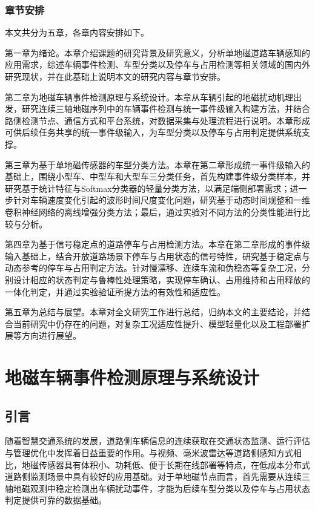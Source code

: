 \documentclass{xdupgthesis}
\begin{document}
\subsection{章节安排}
\label{sec:thesis_organization}

本文共分为五章，各章内容安排如下。

第一章为绪论。本章介绍课题的研究背景及研究意义，分析单地磁道路车辆感知的应用需求，综述车辆事件检测、车型分类以及停车与占用检测等相关领域的国内外研究现状，并在此基础上说明本文的研究内容与章节安排。

第二章为地磁车辆事件检测原理与系统设计。本章从车辆引起的地磁扰动机理出发，研究连续三轴地磁序列中的车辆事件检测与统一事件级输入构建方法，并结合路侧检测节点、通信方式和平台系统，对数据采集与处理流程进行说明。本章形成可供后续任务共享的统一事件级输入，为车型分类以及停车与占用判定提供系统支撑。

第三章为基于单地磁传感器的车型分类方法。本章在第二章形成统一事件级输入的基础上，围绕小型车、中型车和大型车三分类任务，首先构建事件级分类样本，并研究基于统计特征与Softmax分类器的轻量分类方法，以满足端侧部署需求；进一步针对车辆速度变化引起的波形时间尺度变化问题，研究基于动态时间规整和一维卷积神经网络的离线增强分类方法；最后，通过实验对不同方法的分类性能进行比较与分析。

第四章为基于信号稳定点的道路停车与占用检测方法。本章在第二章形成的事件级输入基础上，结合开放道路场景下停车与占用状态的信号特性，研究基于稳定点与动态参考的停车与占用判定方法。针对慢漂移、连续车流和伪稳态等复杂工况，分别设计相应的状态判定与鲁棒性处理策略，实现停车确认、占用维持和占用释放的一体化判定，并通过实验验证所提方法的有效性和适应性。

第五章为总结与展望。本章对全文研究工作进行总结，归纳本文的主要结论，并结合当前研究中仍存在的问题，对复杂工况适应性提升、模型轻量化以及工程部署扩展等方向进行展望。








\chapter{地磁车辆事件检测原理与系统设计}
\label{ch:ch2_event_detect}

\section{引言}
\label{sec:ch2_intro}

随着智慧交通系统的发展，道路侧车辆信息的连续获取在交通状态监测、运行评估与管理优化中发挥着日益重要的作用。与视频、毫米波雷达等道路侧感知方式相比，地磁传感器具有体积小、功耗低、便于长期在线部署等特点，在低成本分布式道路侧监测场景中具有较好的应用基础\cite{wang2018roadside}。对于单地磁节点而言，首先需要从连续三轴地磁观测中稳定检测出车辆扰动事件，才能为后续车型分类以及停车与占用状态判定提供可靠的数据基础。
\end{document}
